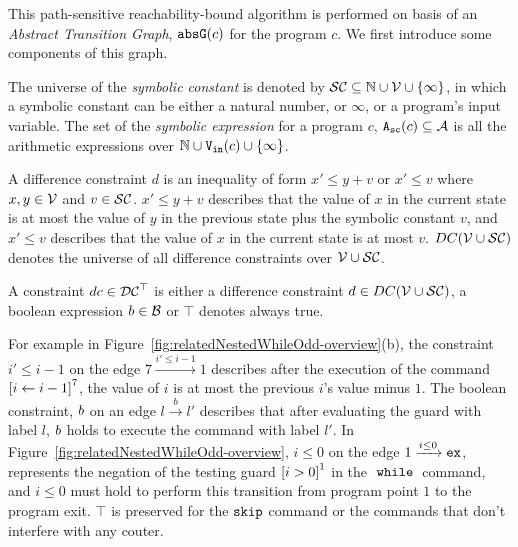 This path-sensitive reachability-bound algorithm
is performed on basis of an \emph{Abstract Transition Graph}, $\mathtt{abs}{\mathtt{G}}(c)$
for the program $c$.
We first introduce some components of this graph.
\begin{defn}
 \label{def:symbolic_expr}
The universe of the \emph{symbolic constant} is denoted by $\mathcal{SC} \subseteq \mathbb{N} \cup \mathcal{V} \cup \{\infty \}$, in which a symbolic constant can be either a natural number, or $\infty$, or a program's input variable.
 The set of the \emph{symbolic expression} for a program $c$, ${\mathtt{A_{sc}}}(c) \subseteq \mathcal{A}$ is all the arithmetic expressions over $\mathbb{N} \cup {\ensuremath{\mathtt{V_{\mathtt{in}}}}}(c) \cup \{\infty \}$.
\end{defn}

\begin{defn}
A difference constraint $d$ is an inequality of
form $x' \leq y + v$ or $x' \leq v$ where $x, y \in \mathcal{V} $ and $v \in \mathcal{SC}$.
$x' \leq y + v$ describes that the value of $x$ in the current state is
at most the value of $y$ in the previous state plus the symbolic constant $v$, and $x' \leq v$ describes that the value of $x$ in the current state is
at most $v$.
$DC(\mathcal{V} \cup \mathcal{SC})$ denotes the universe of all difference constraints over $\mathcal{V} \cup \mathcal{SC}$.
\end{defn}

\begin{defn}[Constraints]
A constraint $dc \in \mathcal{DC}^{\top}$
is either a
difference constraint $d \in DC(\mathcal{V} \cup \mathcal{SC})$, a boolean expression $b \in \mathcal{B}$
or $\top$ denotes always true.
\end{defn}
For example in Figure~\ref{fig:relatedNestedWhileOdd-overview}(b), the constraint $i' \leq i - 1$ on the edge $7 \xrightarrow{i' \leq i - 1} 1$
describes after the execution of
 the command
$\clabel{\assign{i}{i - 1}}^{7}$, the value of $i$ is at most the previous $i$'s value minus $1$.
%
%
The boolean constraint, $b$ on an edge $l \xrightarrow{b} l'$ describes
that after evaluating the guard with label $l$,
$b$ holds to execute the command with label $l'$.
In Figure~\ref{fig:relatedNestedWhileOdd-overview}, $i \leq 0 $ on the edge $1 \xrightarrow{i \leq 0} \mathtt{ex}$, 
represents the negation of the testing guard $\clabel{i > 0}^1$
in the $\;\mathtt{while}\;$ command, and $i \leq 0$ must hold to perform this transition from program point $1$ to
the program exit. 
$\top$ is preserved for the $\mathtt{skip}$ command or the commands that don't interfere with any couter.

